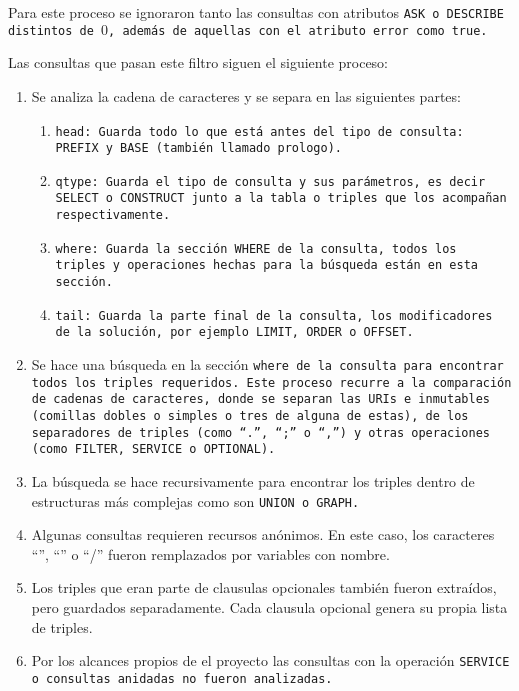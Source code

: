 Para este proceso se ignoraron tanto las consultas con atributos \tt{ASK} o
\tt{DESCRIBE} distintos de $0$, además de aquellas con el atributo \tt{error}
como \tt{true}.

Las consultas que pasan este filtro siguen el siguiente proceso:
\begin{enumerate}
  \item
    Se analiza la cadena de caracteres y se separa en las siguientes partes:
    \begin{enumerate}
      \item
        \tt{head}: Guarda todo lo que está antes del tipo de consulta:
        \tt{PREFIX} y \tt{BASE} (también llamado prologo).
      \item
        \tt{qtype}: Guarda el tipo de consulta y sus parámetros, es decir
        \tt{SELECT} o \tt{CONSTRUCT} junto a la tabla o triples que los
        acompañan respectivamente.
      \item
        \tt{where}: Guarda la sección \tt{WHERE} de la consulta, todos los
        triples y operaciones hechas para la búsqueda están en esta sección.
      \item
        \tt{tail}: Guarda la parte final de la consulta, los modificadores de la
        solución, por ejemplo \tt{LIMIT}, \tt{ORDER} o \tt{OFFSET}.
    \end{enumerate}
  \item
    Se hace una búsqueda en la sección \tt{where} de la consulta para encontrar
    todos los triples requeridos. Este proceso recurre a la comparación de
    cadenas de caracteres, donde se separan las URIs e inmutables (comillas
    dobles o simples o tres de alguna de estas), de los separadores de triples
    (como ``\tt{.}'', ``\tt{;}'' o ``\tt{,}'') y otras operaciones (como
    \tt{FILTER},    \tt{SERVICE} o \tt{OPTIONAL}).
  \item
    La búsqueda se hace recursivamente para encontrar los triples dentro de
    estructuras más complejas como son \tt{UNION} o \tt{GRAPH}.
  \item
    Algunas consultas requieren recursos anónimos. En este caso, los
    caracteres ``\lbrack'', ``\rbrack'' o ``/'' fueron remplazados por variables
    con nombre.
  \item
    Los triples que eran parte de clausulas opcionales también fueron extraídos,
    pero guardados separadamente. Cada clausula opcional genera su propia lista
    de triples.
  \item
    Por los alcances propios de el proyecto las consultas con la operación
    \tt{SERVICE} o consultas anidadas no fueron analizadas.
\end{enumerate}


